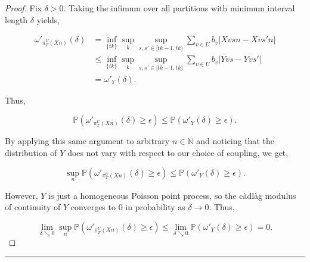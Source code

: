 \documentclass[12pt]{article}
\newcommand{\mb}{\mathbb}
\newcommand{\ra}{\rightarrow}
\newcommand{\ep}{\epsilon}
\newcommand{\lin}{\rule{\linewidth}{0.4 pt}}
\newcommand{\pr}{\mb{P}}							%
\renewcommand{\v}{v}							%
\renewcommand{\U}{U}							%
\renewcommand{\b}{b}							%
\newcommand{\T}{T}								%
\renewcommand{\t}{t}							%
\newcommand{\proj}{\pi}							%
\renewcommand{\tt}{s}							%
\newcommand{\ttt}{s'}							%
\newcommand{\X}{X}								%
\newcommand{\vsi}[1]{^{#1}}						%
\newcommand{\cind}[1]{_{#1}}					%
\newcommand{\ts}[1]{_{#1}}						%
\newcommand{\XX}{Y}								%
\renewcommand{\it}{k}							%
\begin{document}
\begin{proof}
Fix \(\delta > 0\). Taking the infimum over all partitions with minimum interval length \(\delta\) yields,

\begin{align*}
\omega'_{\proj\vsi{\U}\ts{\T}\left(\X{}{}{n}\right)}(\delta) &= \inf_{\{\t{\it}\}}\sup_\it\sup_{\tt,\ttt \in [\t{\it-1},\t{\it})} \sum_{\v\in \U} \b\cind{\v}|\X{\v}{\tt}{n} - \X{\v}{\ttt}{n}|\\
&\leq \inf_{\{\t{\it}\}}\sup_\it\sup_{\tt,\ttt \in [\t{\it-1},\t{\it})} \sum_{\v\in \U} \b\cind{\v}|\XX{\v}{\tt} - \XX{\v}{\ttt}|\\
&= \omega'_{\XX{}{}}(\delta).
\end{align*}

Thus,

\[\pr\left(\omega'_{\proj\vsi{\U}\ts{\T}\left(\X{}{}{n}\right)}(\delta) \geq \ep\right) \leq \pr\left(\omega'_{\XX{}{}}(\delta) \geq \ep\right).\]

By applying this same argument to arbitrary \(n\in \mb{N}\) and noticing that the distribution of \(\XX{}{}\) does not vary with respect to our choice of coupling, we get,

\[\sup_{n}\pr\left(\omega'_{\proj\vsi{\U}\ts{\T}\left(\X{}{}{n}\right)}(\delta)\geq \ep\right) \leq \pr\left(\omega'_{\XX{}{}}(\delta) \geq \ep\right).\]

However, \(\XX{}{}\) is just a homogeneous Poisson point process, so the c\`adl\`ag modulus of continuity of \(\XX{}{}\) converges to 0 in probability as \(\delta \ra 0\). Thus,

\[\lim_{\delta \searrow 0}\sup_{n}\pr\left(\omega'_{\proj\vsi{\U}\ts{\T}\left(\X{}{}{n}\right)}(\delta) \geq \ep\right) \leq \lim_{\delta\searrow 0}\pr\left(\omega'_{\XX{}{}}(\delta)\geq \ep\right) = 0.\]


\end{proof}

\lin
\end{document}
